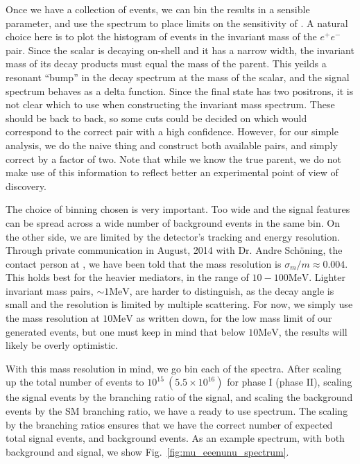 Once we have a collection of events, we can bin the results in a sensible parameter, and use the spectrum to place limits on the sensitivity of \mueee.
A natural choice here is to plot the histogram of events in the invariant mass of the $e^+ e^-$ pair.
Since the scalar is decaying on-shell and it has a narrow width, the invariant mass of its decay products must equal the mass of the parent.
This yeilds a resonant ``bump'' in the decay spectrum at the mass of the scalar, and the signal spectrum behaves as a delta function.
Since the final state has two positrons, it is not clear which to use when constructing the invariant mass spectrum.
These should be back to back, so some cuts could be decided on which would correspond to the correct pair with a high confidence.
However, for our simple analysis, we do the naive thing and construct both available pairs, and simply correct by a factor of two.
Note that while we know the true parent, we do not make use of this information to reflect better an experimental point of view of discovery.

The choice of binning chosen is very important.
Too wide and the signal features can be spread across a wide number of background events in the same bin.
On the other side, we are limited by the detector's tracking and energy resolution.
Through private communication in August, 2014 with Dr. Andre Sch\"oning, the contact person at \mueee, we have been told that the mass resolution is $\sigma_m / m \approx 0.004$.
This holds best for the heavier mediators, in the range of $10 - 100\textrm{MeV}$.
Lighter invariant mass pairs, $\sim 1\textrm{MeV}$, are harder to distinguish, as the decay angle is small and the resolution is limited by multiple scattering.
For now, we simply use the mass resolution at $10\textrm{MeV}$ as written down, for the low mass limit of our generated events, but one must keep in mind that below $10\textrm{MeV}$, the results will likely be overly optimistic.

With this mass resolution in mind, we go bin each of the spectra.
After scaling up the total number of events to $10^{15}~(5.5\times 10^{16})$ for \mueee phase I (phase II), scaling the signal events by the branching ratio of the signal, and scaling the background events by the SM branching ratio, we have a ready to use spectrum.
The scaling by the branching ratios ensures that we have the correct number of expected total signal events, and background events.
As an example spectrum, with both background and signal, we show Fig.\ \ref{fig:mu_eeenunu_spectrum}.

